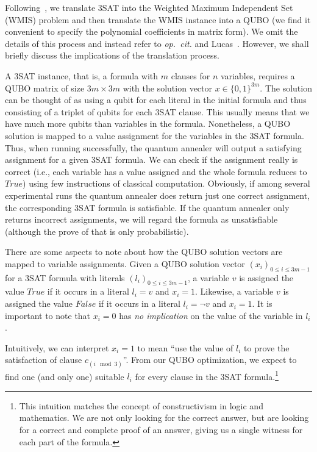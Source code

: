Following~\cite{choi2010adiabatic,choi2011different}, we translate 3SAT into the Weighted Maximum Independent Set (WMIS) problem and then translate the WMIS instance into a QUBO (we find it convenient to specify the polynomial coefficients in matrix form). We omit the details of this process and instead refer to \emph{op.~cit.} and Lucas~\cite{lucas2014ising}. However, we shall briefly discuss the implications of the translation process.

A 3SAT instance, that is, a formula with $m$ clauses for $n$ variables,
requires a QUBO matrix of size $3m \times 3m$ with the solution vector $x \in \{0,1\}^{3m}$. The solution can be thought of as using a qubit for each literal in the initial formula and thus consisting of a triplet of qubits for each 3SAT clause. This usually means that we have much more qubits than variables in the formula. Nonetheless, a QUBO solution is mapped to a value assignment for the variables in the 3SAT formula. Thus, when running successfully, the quantum annealer will output a satisfying assignment for a given 3SAT formula. We can check if the assignment really is correct (i.e., each variable has a value assigned and the whole formula reduces to $\textit{True}$) using few instructions of classical computation. Obviously, if among several experimental runs the quantum annealer does return just one correct assignment, the corresponding 3SAT formula is satisfiable. If the quantum annealer only returns incorrect assignments, we will regard the formula as unsatisfiable (although the prove of that is only probabilistic).

There are some aspects to note about how the QUBO solution vectors are mapped to variable assignments. Given a QUBO solution vector $(x_i)_{0 \leq i \leq 3m-1}$ for a 3SAT formula with literals $(l_i)_{0 \leq i \leq 3m-1}$, a variable $v$ is assigned the value $\textit{True}$ if it occurs in a literal $l_i = v$ and $x_i = 1$. Likewise, a variable $v$ is assigned the value $\textit{False}$ if it occurs in a literal $l_i = \lnot v$ and $x_i = 1$. It is important to note that $x_i = 0$ has \emph{no implication} on the value of the variable in $l_i$.

Intuitively, we can interpret $x_i = 1$ to mean ``use the value of $l_i$ to prove the satisfaction of clause $c_{(i \mod 3)}$''. From our QUBO optimization, we expect to find one (and only one) suitable $l_i$ for every clause in the 3SAT formula.\footnote{This intuition matches the concept of constructivism in logic and mathematics. We are not only looking for the correct answer, but are looking for a correct and complete proof of an answer, giving us a single witness for each part of the formula.}

